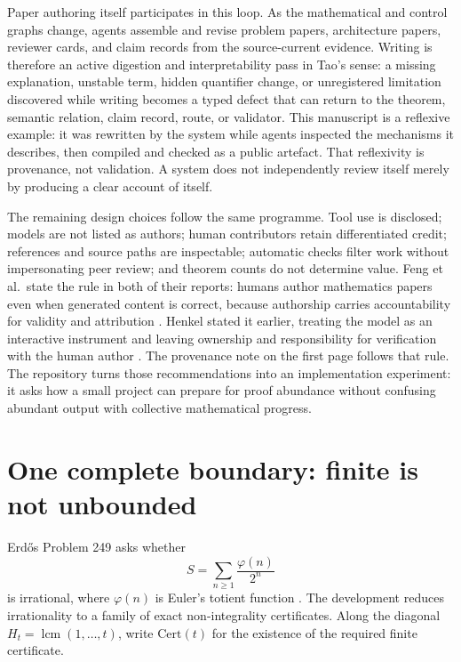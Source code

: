 \documentclass[10pt]{article}
\begin{document}
Paper authoring itself participates in this loop. As the mathematical and
control graphs change, agents assemble and revise problem papers, architecture
papers, reviewer cards, and claim records from the source-current evidence.
Writing is therefore an active digestion and interpretability pass in Tao's
sense: a missing explanation, unstable term, hidden quantifier change, or
unregistered limitation discovered while writing becomes a typed defect that
can return to the theorem, semantic relation, claim record, route, or validator.
This manuscript is a reflexive example: it was rewritten by the system while
agents inspected the mechanisms it describes, then compiled and checked as a
public artefact. That reflexivity is provenance, not validation. A system does
not independently review itself merely by producing a clear account of itself.

The remaining design choices follow the same programme. Tool use is disclosed;
models are not listed as authors; human contributors retain differentiated
credit; references and source paths are inspectable; automatic checks filter
work without impersonating peer review; and theorem counts do not determine
value. Feng et al.\ state the rule in both of their reports: humans author
mathematics papers even when generated content is correct, because
authorship carries accountability for validity and attribution
\cite{aletheia,autonomousmath}. Henkel stated it earlier, treating the model
as an interactive instrument and leaving ownership and responsibility for
verification with the human author \cite{henkel}. The provenance note on the
first page follows that rule. The
repository turns those recommendations into an implementation
experiment: it asks how a small project can
prepare for proof abundance without confusing abundant output with collective
mathematical progress.

\section{One complete boundary: finite is not unbounded}\label{sec:example}

Erd\H{o}s Problem 249 asks whether
\[
S=\sum_{n\ge1}\frac{\varphi(n)}{2^n}
\]
is irrational, where \(\varphi(n)\) is Euler's totient function
\cite{erdosgraham}. The development reduces irrationality to a family of exact
non-integrality certificates. Along the diagonal
\(H_t=\operatorname{lcm}(1,\ldots,t)\), write \(\mathrm{Cert}(t)\) for the
existence of the required finite certificate.
\end{document}

